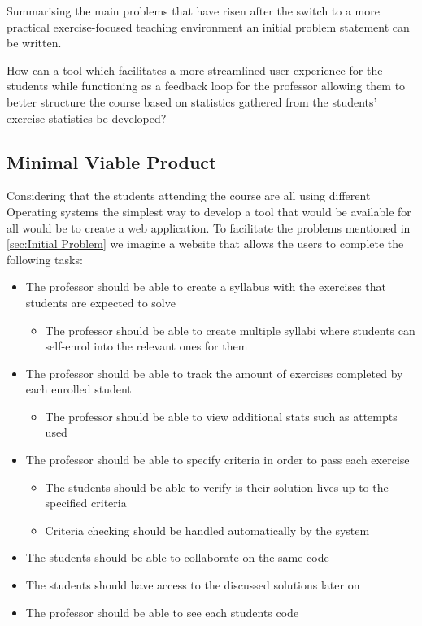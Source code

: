 Summarising the main problems that have risen after the switch to a more practical exercise-focused teaching environment an initial problem statement can be written.
\begin{displayquote}
How can a tool which facilitates a more streamlined user experience for the students while functioning as a feedback loop for the professor allowing them to better structure the course based on statistics gathered from the students' exercise statistics be developed?
\end{displayquote} 

\subsection{Minimal Viable Product}
Considering that the students attending the course are all using different Operating systems the simplest way to develop a tool that would be available for all would be to create a web application. To facilitate the problems mentioned in \ref{sec:Initial Problem} we imagine a website that allows the users to complete the following tasks:
\begin{itemize}
	\item The professor should be able to create a syllabus with the exercises that students are expected to solve
	\begin{itemize}
		\item The professor should be able to create multiple syllabi where students can self-enrol into the relevant ones for them
	\end{itemize}
	\item The professor should be able to track the amount of exercises completed by each enrolled student
	\begin{itemize}
		\item The professor should be able to view additional stats such as attempts used 
	\end{itemize}
	\item The professor should be able to specify criteria in order to pass each exercise 
	\begin{itemize}
		\item The students should be able to verify is their solution lives up to the specified criteria
		\item Criteria checking should be handled automatically by the system
	\end{itemize}
	\item The students should be able to collaborate on the same code
	\item The students should have access to the discussed solutions later on
	\item The professor should be able to see each students code
\end{itemize}

